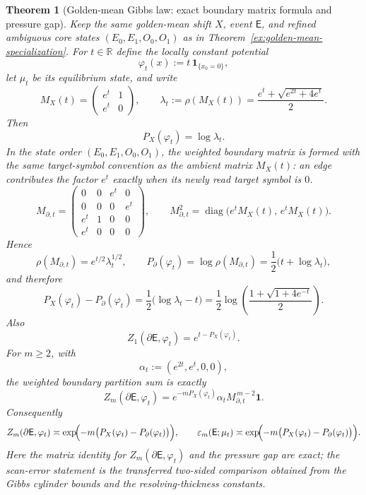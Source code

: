 \documentclass{etds}%
\numberwithin{equation}{section}
\theoremstyle{plain}
\newtheorem{theorem}{Theorem}[section]
\theoremstyle{definition}
\theoremstyle{remark}
\begin{document}
\begin{theorem}[Golden-mean Gibbs law: exact boundary matrix formula and pressure gap]
\label{ex:golden-mean-gibbs-weighted}
Keep the same golden-mean shift $X$, event $\mathsf{E}$, and refined
ambiguous core states $(E_0,E_1,O_0,O_1)$ as in
Theorem~\ref{ex:golden-mean-specialization}.  For $t\in\mathbb{R}$ define the
locally constant potential
\[
\varphi_t(x):=t\,\mathbf{1}_{\{x_0=0\}},
\]
let $\mu_t$ be its equilibrium state, and write
\[
M_X(t)
=\begin{pmatrix}
e^t&1\\
e^t&0
\end{pmatrix},
\qquad
\lambda_t:=\rho(M_X(t))
=\frac{e^t+\sqrt{e^{2t}+4e^t}}{2}.
\]
Then
\[
P_X(\varphi_t)=\log\lambda_t.
\]
In the state order $(E_0,E_1,O_0,O_1)$, the weighted boundary matrix is
formed with the same target-symbol convention as the ambient matrix
$M_X(t)$: an edge contributes the factor $e^t$ exactly when its newly read
target symbol is $0$.
\[
M_{\partial,t}
=\begin{pmatrix}
0&0&e^t&0\\[2pt]
0&0&0&e^t\\[2pt]
e^t&1&0&0\\[2pt]
e^t&0&0&0
\end{pmatrix},
\qquad
M_{\partial,t}^2
=\operatorname{diag}\!\bigl(e^tM_X(t),\,e^tM_X(t)\bigr).
\]
Hence
\[
\rho(M_{\partial,t})=e^{t/2}\lambda_t^{1/2},
\qquad
P_\partial(\varphi_t)=\log\rho(M_{\partial,t})
=\frac12\bigl(t+\log\lambda_t\bigr),
\]
and therefore
\[
P_X(\varphi_t)-P_\partial(\varphi_t)
=\frac12\bigl(\log\lambda_t-t\bigr)
=\frac12\log\!\left(\frac{1+\sqrt{1+4e^{-t}}}{2}\right).
\]
Also
\[
Z_1(\partial\mathsf{E},\varphi_t)=e^{t-P_X(\varphi_t)}.
\]
For $m\ge 2$, with
\[
\alpha_t:=(e^{2t},e^t,0,0),
\]
the weighted boundary partition sum is exactly
\[
Z_m(\partial\mathsf{E},\varphi_t)
=e^{-mP_X(\varphi_t)}\alpha_t M_{\partial,t}^{\,m-2}\mathbf{1}.
\]
Consequently
\[
Z_m(\partial\mathsf{E},\varphi_t)\asymp
\exp\!\Bigl(-m\bigl(P_X(\varphi_t)-P_\partial(\varphi_t)\bigr)\Bigr),
\qquad
\varepsilon_m(\mathsf{E};\mu_t)\asymp
\exp\!\Bigl(-m\bigl(P_X(\varphi_t)-P_\partial(\varphi_t)\bigr)\Bigr).
\]
Here the matrix identity for $Z_m(\partial\mathsf{E},\varphi_t)$ and the
pressure gap are exact; the scan-error statement is the transferred
two-sided comparison obtained from the Gibbs cylinder bounds and the
resolving-thickness constants.
\end{theorem}
\end{document}
